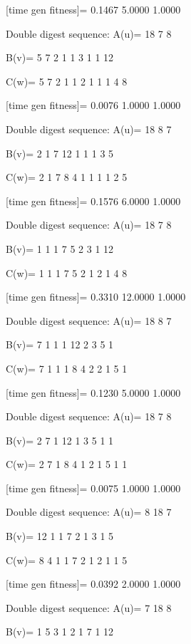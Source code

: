 [time gen fitness]=
    0.1467    5.0000    1.0000

Double digest sequence:
A(u)=
    18     7     8

B(v)=
     5     7     2     1     1     3     1     1    12

C(w)=
     5     7     2     1     1     2     1     1     1     4     8

[time gen fitness]=
    0.0076    1.0000    1.0000

Double digest sequence:
A(u)=
    18     8     7

B(v)=
     2     1     7    12     1     1     1     3     5

C(w)=
     2     1     7     8     4     1     1     1     1     2     5

[time gen fitness]=
    0.1576    6.0000    1.0000

Double digest sequence:
A(u)=
    18     7     8

B(v)=
     1     1     1     7     5     2     3     1    12

C(w)=
     1     1     1     7     5     2     1     2     1     4     8

[time gen fitness]=
    0.3310   12.0000    1.0000

Double digest sequence:
A(u)=
    18     8     7

B(v)=
     7     1     1     1    12     2     3     5     1

C(w)=
     7     1     1     1     8     4     2     2     1     5     1

[time gen fitness]=
    0.1230    5.0000    1.0000

Double digest sequence:
A(u)=
    18     7     8

B(v)=
     2     7     1    12     1     3     5     1     1

C(w)=
     2     7     1     8     4     1     2     1     5     1     1

[time gen fitness]=
    0.0075    1.0000    1.0000

Double digest sequence:
A(u)=
     8    18     7

B(v)=
    12     1     1     7     2     1     3     1     5

C(w)=
     8     4     1     1     7     2     1     2     1     1     5

[time gen fitness]=
    0.0392    2.0000    1.0000

Double digest sequence:
A(u)=
     7    18     8

B(v)=
     1     5     3     1     2     1     7     1    12

